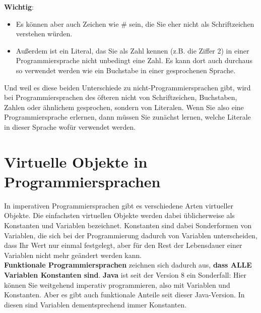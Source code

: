\textbf{Wichtig}:

\begin{itemize}
	\item Es können aber auch Zeichen wie \# sein, die Sie eher nicht als Schriftzeichen verstehen würden.
	\item Außerdem ist ein Literal, das Sie als Zahl kennen (z.B. die Ziffer 2) in einer Programmiersprache nicht unbedingt eine Zahl. Es kann dort auch durchaus so verwendet werden wie ein Buchstabe in einer gesprochenen Sprache.
\end{itemize}

Und weil es diese beiden Unterschiede zu nicht-Programmiersprachen gibt, wird bei Programmiersprachen des öfteren nicht von Schriftzeichen, Buchstaben, Zahlen oder ähnlichem gesprochen, sondern von Literalen. Wenn Sie also eine Programmiersprache erlernen, dann müssen Sie zunächst lernen, welche Literale in dieser Sprache wofür verwendet werden.

\section{Virtuelle Objekte in Programmiersprachen}

In imperativen Programmiersprachen gibt es verschiedene Arten virtueller Objekte. Die einfachsten virtuellen Objekte werden dabei üblicherweise als Konstanten und Variablen bezeichnet. Konstanten sind dabei Sonderformen von Variablen, die sich bei der Programmierung dadurch von Variablen unterscheiden, dass Ihr Wert nur einmal festgelegt, aber für den Rest der Lebensdauer einer Variablen nicht mehr geändert werden kann.\\

\textbf{Funktionale Programmiersprachen} zeichnen sich dadurch aus, \textbf{dass ALLE Variablen Konstanten sind}. \textbf{Java} ist seit der Version 8 ein Sonderfall: Hier können Sie weitgehend imperativ programmieren, also mit Variablen und Konstanten. Aber es gibt auch funktionale Anteile seit dieser Java-Version. In diesen sind Variablen dementsprechend immer Konstanten. \\

